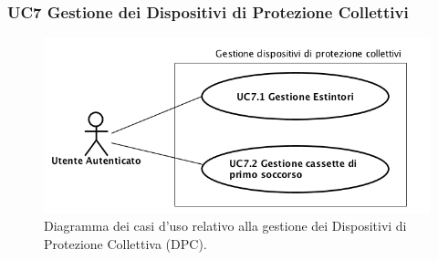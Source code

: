 	\newpage	
	\subsubsection{UC7 Gestione dei Dispositivi di Protezione Collettivi}
		\label{section:UC7}
		\begin{figure}[H]
			\begin{center}
				\includegraphics[width=12cm]{Pics/UC7GestioneDispositiviProtezioneCollettivi.png}
				\caption{Diagramma dei casi d'uso relativo alla gestione dei Dispositivi di Protezione Collettiva (DPC).}
				\label{fig:UC7_DPC}
			\end{center}
		\end{figure}
		
